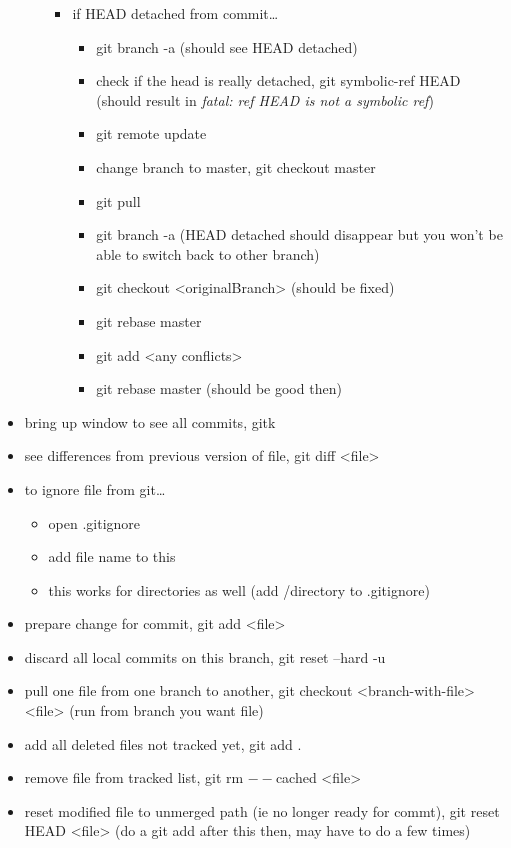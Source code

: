 \documentclass[11pt]{article}
\begin{document}
\begin{itemize}
\begin{itemize}
\begin{itemize}
\item if HEAD detached from commit\ldots{}
\begin{itemize}
\item git branch -a (should see HEAD detached)
\item check if the head is really detached, git symbolic-ref HEAD (should result in \emph{fatal: ref HEAD is not a symbolic ref})
\item git remote update
\item change branch to master, git checkout master
\item git pull
\item git branch -a (HEAD detached should disappear but you won't be able to switch back to other branch)
\item git checkout <originalBranch> (should be fixed)
\item git rebase master
\item git add <any conflicts>
\item git rebase master (should be good then)
\end{itemize}
\end{itemize}
\end{itemize}
\item bring up window to see all commits, gitk
\item see differences from previous version of file, git diff <file>
\item to ignore file from git\ldots{}
\begin{itemize}
\item open .gitignore
\item add file name to this
\item this works for directories as well (add /directory to .gitignore)
\end{itemize}
\item prepare change for commit, git add <file>
\item discard all local commits on this branch, git reset --hard -u
\item pull one file from one branch to another, git checkout <branch-with-file> <file> (run from branch you want file)
\item add all deleted files not tracked yet, git add .
\item remove file from tracked list, git rm \(--\)cached <file>
\item reset modified file to unmerged path (ie no longer ready for commt), git reset HEAD <file> (do a git add after this then, may have to do a few times)

\end{itemize}
\end{document}
